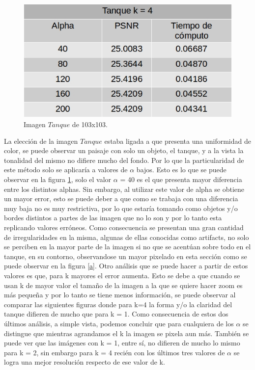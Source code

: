 \documentclass[a4paper]{article}
\newcounter{col}
\begin{document}
\begin{figure}[H]
    \centering
    \includegraphics[scale=0.4]{imagenes/tanque4.jpg}
    \caption{Imagen $Tanque$ de 103x103.}
	\label{tanquee}
    \end{figure}    
    
La elección de la imagen $Tanque$ estaba ligada a que presenta una uniformidad de color, se puede observar un paisaje con solo un objeto, el tanque, y a la vista la tonalidad del mismo no difiere mucho del fondo. Por lo que la particularidad de este método solo se aplicaría a valores de $\alpha$ bajos. Esto es lo que se puede observar en la figura \ref{tanquee}, solo el valor $\alpha$ = 40 es el que presenta mayor diferencia entre los distintos alphas. Sin embargo, al utilizar este valor de alpha se obtiene un mayor error, esto se puede deber a que como se trabaja con una diferencia muy baja no es muy restrictiva, por lo que estaría tomando como objetos y/o bordes distintos a partes de las imagen que no lo son y por lo tanto esta replicando valores erróneos. Como consecuencia se presentan una gran cantidad de irregularidades en la misma, algunas de ellas conocidas como artifacts, no solo se perciben en la mayor parte de la imagen si no que se acentúan sobre todo en el tanque, en su contorno, observandose un mayor pixelado en esta sección como se puede observar en la figura \ref{a}. 
Otro análisis que se puede hacer a partir de estos valores es que, para k mayores el error aumenta. Esto se debe a que cuando se usan k de mayor valor el tamaño de la imagen a la que se quiere hacer zoom es más pequeña y por lo tanto se tiene menos información, se puede observar al comparar las siguientes figuras donde para k=4 la forma y/o la claridad del tanque difieren de mucho que para k = 1. Como consecuencia de estos dos últimos análisis, a simple vista, podemos concluir que para cualquiera de los $\alpha$ se distingue que mientras agrandamos el k la imagen se pixela aun más. También se puede ver que las imágenes con k = 1, entre sí, no difieren de mucho lo mismo para k = 2, sin embargo para k = 4 recién con los últimos tres valores de $\alpha$ se logra una mejor resolución respecto de ese valor de k. 
\end{document}
